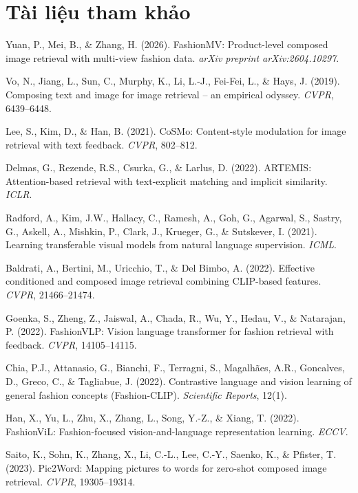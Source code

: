 \documentclass[a4paper]{article}
\begin{document}
\section{Tài liệu tham khảo}
\begin{enumerate}[label={[\arabic*]},leftmargin=*,itemsep=3pt]
\small
\item Yuan, P., Mei, B., \& Zhang, H. (2026). FashionMV: Product-level composed image retrieval with multi-view fashion data. \textit{arXiv preprint arXiv:2604.10297}.
\item Vo, N., Jiang, L., Sun, C., Murphy, K., Li, L.-J., Fei-Fei, L., \& Hays, J. (2019). Composing text and image for image retrieval -- an empirical odyssey. \textit{CVPR}, 6439--6448.
\item Lee, S., Kim, D., \& Han, B. (2021). CoSMo: Content-style modulation for image retrieval with text feedback. \textit{CVPR}, 802--812.
\item Delmas, G., Rezende, R.S., Csurka, G., \& Larlus, D. (2022). ARTEMIS: Attention-based retrieval with text-explicit matching and implicit similarity. \textit{ICLR}.
\item Radford, A., Kim, J.W., Hallacy, C., Ramesh, A., Goh, G., Agarwal, S., Sastry, G., Askell, A., Mishkin, P., Clark, J., Krueger, G., \& Sutskever, I. (2021). Learning transferable visual models from natural language supervision. \textit{ICML}.
\item Baldrati, A., Bertini, M., Uricchio, T., \& Del Bimbo, A. (2022). Effective conditioned and composed image retrieval combining CLIP-based features. \textit{CVPR}, 21466--21474.
\item Goenka, S., Zheng, Z., Jaiswal, A., Chada, R., Wu, Y., Hedau, V., \& Natarajan, P. (2022). FashionVLP: Vision language transformer for fashion retrieval with feedback. \textit{CVPR}, 14105--14115.
\item Chia, P.J., Attanasio, G., Bianchi, F., Terragni, S., Magalhães, A.R., Goncalves, D., Greco, C., \& Tagliabue, J. (2022). Contrastive language and vision learning of general fashion concepts (Fashion-CLIP). \textit{Scientific Reports}, 12(1).
\item Han, X., Yu, L., Zhu, X., Zhang, L., Song, Y.-Z., \& Xiang, T. (2022). FashionViL: Fashion-focused vision-and-language representation learning. \textit{ECCV}.
\item Saito, K., Sohn, K., Zhang, X., Li, C.-L., Lee, C.-Y., Saenko, K., \& Pfister, T. (2023). Pic2Word: Mapping pictures to words for zero-shot composed image retrieval. \textit{CVPR}, 19305--19314.

\end{enumerate}
\end{document}

